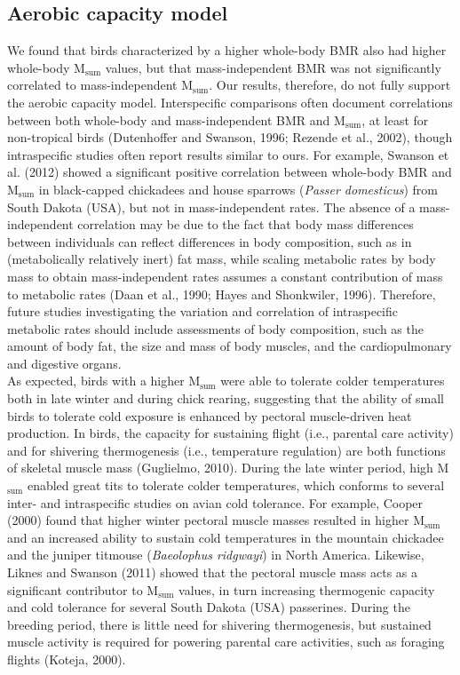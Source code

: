 \documentclass[10pt, twoside]{book} %
\begin{document}
\subsection{Aerobic capacity model}
We found that birds characterized by a higher whole-body BMR also had higher whole-body M$_{\text{sum}}$ values, but that mass-independent BMR was not significantly correlated to mass-independent M$_{\text{sum}}$. Our results, therefore, do not fully support the aerobic capacity model. Interspecific comparisons often document correlations between both whole-body and mass-independent BMR and M$_{\text{sum}}$, at least for non-tropical birds (Dutenhoffer and Swanson, 1996; Rezende et al., 2002), though intraspecific studies often report results similar to ours. For example, Swanson et al. (2012) showed a significant positive correlation between whole-body BMR and M$_{\text{sum}}$ in black-capped chickadees and house sparrows (\textit{Passer domesticus}) from South Dakota (USA), but not in mass-independent rates. The absence of a mass-independent correlation may be due to the fact that body mass differences between individuals can reflect differences in body composition, such as in (metabolically relatively inert) fat mass, while scaling metabolic rates by body mass to obtain mass-independent rates assumes a constant contribution of mass to metabolic rates (Daan et al., 1990; Hayes and Shonkwiler, 1996). Therefore, future studies investigating the variation and correlation of intraspecific metabolic rates should include assessments of body composition, such as the amount of body fat, the size and mass of body muscles, and the cardiopulmonary and digestive organs.\\

As expected, birds with a higher M$_{\text{sum}}$ were able to tolerate colder temperatures both in late winter and during chick rearing, suggesting that the ability of small birds to tolerate cold exposure is enhanced by pectoral muscle-driven heat production. In birds, the capacity for sustaining flight (i.e., parental care activity) and for shivering thermogenesis (i.e., temperature regulation) are both functions of skeletal muscle mass (Guglielmo, 2010). During the late winter period, high M$_{\text{sum}}$ enabled great tits to tolerate colder temperatures, which conforms to several inter- and intraspecific studies on avian cold tolerance. For example, Cooper (2000) found that higher winter pectoral muscle masses resulted in higher M$_{\text{sum}}$ and an increased ability to sustain cold temperatures in the mountain chickadee and the juniper titmouse (\textit{Baeolophus ridgwayi}) in North America. Likewise, Liknes and Swanson (2011) showed that the pectoral muscle mass acts as a significant contributor to M$_{\text{sum}}$ values, in turn increasing thermogenic capacity and cold tolerance for several South Dakota (USA) passerines. During the breeding period, there is little need for shivering thermogenesis, but sustained muscle activity is required for powering parental care activities, such as foraging flights (Koteja, 2000).\\
\end{document}
